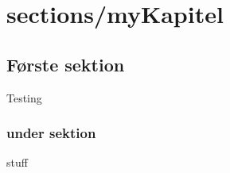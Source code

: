%
\cfoot{\page\textbackslash \totalp} %
\setcounter{page}{1}
\chapter{sections/myKapitel}

\section{Første sektion}
Testing
\subsection{under sektion}

\cite{HTL}stuff
%